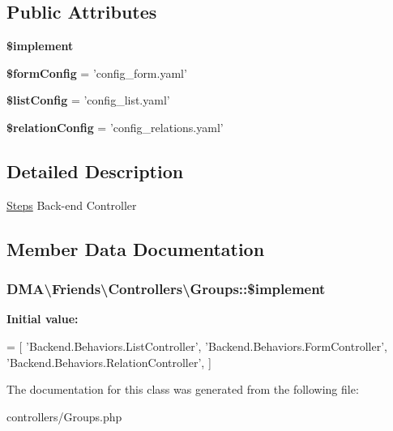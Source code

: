 \subsection*{Public Attributes}
\begin{DoxyCompactItemize}
\item 
{\bfseries \$implement}
\item 
\hypertarget{classDMA_1_1Friends_1_1Controllers_1_1Groups_a6eecdf56ed0bb93cd693c06aa945a87b}{{\bfseries \$form\+Config} = 'config\+\_\+form.\+yaml'}\label{classDMA_1_1Friends_1_1Controllers_1_1Groups_a6eecdf56ed0bb93cd693c06aa945a87b}

\item 
\hypertarget{classDMA_1_1Friends_1_1Controllers_1_1Groups_a8cae966221f95dfbba825e1ffde46049}{{\bfseries \$list\+Config} = 'config\+\_\+list.\+yaml'}\label{classDMA_1_1Friends_1_1Controllers_1_1Groups_a8cae966221f95dfbba825e1ffde46049}

\item 
\hypertarget{classDMA_1_1Friends_1_1Controllers_1_1Groups_a1dee3b5ab935f5c8b420f03d4d17f536}{{\bfseries \$relation\+Config} = 'config\+\_\+relations.\+yaml'}\label{classDMA_1_1Friends_1_1Controllers_1_1Groups_a1dee3b5ab935f5c8b420f03d4d17f536}

\end{DoxyCompactItemize}


\subsection{Detailed Description}
\hyperlink{classDMA_1_1Friends_1_1Controllers_1_1Steps}{Steps} Back-\/end Controller 

\subsection{Member Data Documentation}
\hypertarget{classDMA_1_1Friends_1_1Controllers_1_1Groups_aa0c5c09b0b7f0628a1001a8397626577}{
\subsubsection[{\$implement}]{\setlength{\rightskip}{0pt plus 5cm}D\+M\+A\textbackslash{}\+Friends\textbackslash{}\+Controllers\textbackslash{}\+Groups\+::\$implement}}\label{classDMA_1_1Friends_1_1Controllers_1_1Groups_aa0c5c09b0b7f0628a1001a8397626577}
{\bfseries Initial value\+:}
\begin{DoxyCode}
= [
        \textcolor{stringliteral}{'Backend.Behaviors.ListController'},    
        \textcolor{stringliteral}{'Backend.Behaviors.FormController'},
        \textcolor{stringliteral}{'Backend.Behaviors.RelationController'},
    ]
\end{DoxyCode}


The documentation for this class was generated from the following file\+:\begin{DoxyCompactItemize}
\item 
controllers/Groups.\+php\end{DoxyCompactItemize}
